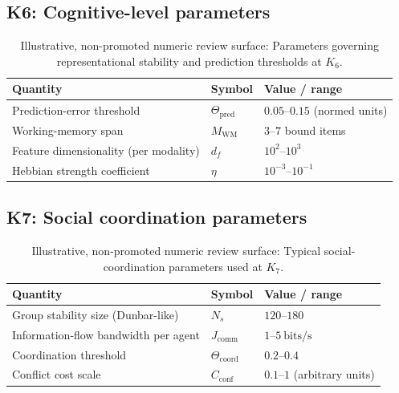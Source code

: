 
\subsection*{K6: Cognitive-level parameters}

\begin{table}[htbp]
  \centering
  \caption{Illustrative, non-promoted numeric review surface: Parameters governing representational stability and prediction thresholds at \(K_6\).}
  \label{tab:k6-cognitive-parameters}
  \begin{tabular}{@{}L{0.44\textwidth}L{0.16\textwidth}L{0.23\textwidth}@{}}
    \hline
    Quantity & Symbol & Value / range \\
    \hline
    Prediction-error threshold & \(\Theta_{\mathrm{pred}}\)
        & \(0.05\text{–}0.15\) (normed units) \\
    Working-memory span & \(M_\mathrm{WM}\)
        & \(3\text{–}7\) bound items \\
    Feature dimensionality (per modality)
        & \(d_f\)
        & \(10^2\text{–}10^3\) \\
    Hebbian strength coefficient & \(\eta\)
        & \(10^{-3}\text{–}10^{-1}\) \\
    \hline
  \end{tabular}
\end{table}


\subsection*{K7: Social coordination parameters}

\begin{table}[htbp]
  \centering
  \caption{Illustrative, non-promoted numeric review surface: Typical social-coordination parameters used at \(K_7\).}
  \label{tab:k7-social-parameters}
  \begin{tabular}{@{}L{0.44\textwidth}L{0.16\textwidth}L{0.23\textwidth}@{}}
    \hline
    Quantity & Symbol & Value / range \\
    \hline
    Group stability size (Dunbar-like) & \(N_s\)
        & \(120\text{–}180\) \\
    Information-flow bandwidth per agent & \(J_\mathrm{comm}\)
        & \(1\text{–}5~\mathrm{bits/s}\) \\
    Coordination threshold & \(\Theta_{\mathrm{coord}}\)
        & \(0.2\text{–}0.4\) \\
    Conflict cost scale & \(C_\mathrm{conf}\)
        & \(0.1\text{–}1\) (arbitrary units) \\
    \hline
  \end{tabular}
\end{table}

